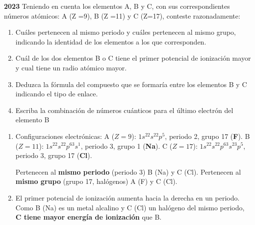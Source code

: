 \begin{exerciseEVAU}
    \textbf{2023} Teniendo en cuenta los elementos A, B y C, con sus correspondientes números atómicos: A (Z =9), B (Z =11) y C (Z=17), conteste razonadamente:

    \begin{enumerate}[label=\letraminuscula]
        \item Cuáles pertenecen al mismo periodo y cuáles pertenecen al mismo grupo, indicando la identidad
        de los elementos a los que corresponden.
        \item Cuál de los dos elementos B o C tiene el primer potencial de ionización mayor y cual tiene un radio
        atómico mayor.
        \item Deduzca la fórmula del compuesto que se formaría entre los elementos B y C indicando el tipo
        de enlace.
        \item Escriba la combinación de números cuánticos para el último electrón del elemento B

    \end{enumerate}



    \begin{solu}


        \begin{enumerate}[label=\letraminuscula]
            \item Configuraciones electrónicas: A (\(Z=9\)): \(1s^22s^22p^5\), periodo 2, grupo 17 (\textbf{F}). B (\(Z=11\)): \(1s^22s^22p^63s^1\), periodo 3, grupo 1 (\textbf{Na}). C (\(Z=17\)): \(1s^22s^22p^63s^23p^5\), periodo 3, grupo 17 (\textbf{Cl}).

            Pertenecen al \textbf{mismo periodo} (periodo 3) B (Na) y C (Cl). Pertenecen al \textbf{mismo grupo} (grupo 17, halógenos) A (F) y C (Cl).

            \item El primer potencial de ionización aumenta hacia la derecha en un periodo. Como B (Na) es un metal alcalino y C (Cl) un halógeno del mismo periodo, \textbf{C tiene mayor energía de ionización} que B.


\end{enumerate}
\end{solu}
\end{exerciseEVAU}
